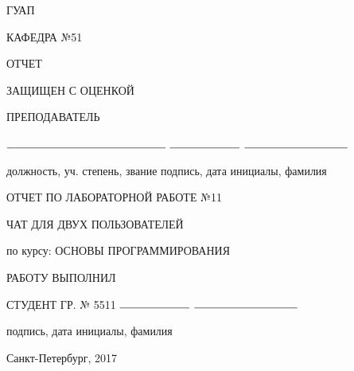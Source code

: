 \documentclass{article}
\begin{document}
\begin{titlepage}
	\begin{center}
    	ГУАП
    	\vspace{0.25cm}

    	КАФЕДРА №51
	\end{center}

    \begin{flushleft}

    	ОТЧЕТ

    	ЗАЩИЩЕН С ОЦЕНКОЙ

		ПРЕПОДАВАТЕЛЬ


    	\vspace{0.5cm}

		$\rule{5cm}{0.15mm}$ \hfill $\rule{2.2cm}{0.15mm}$  \hfill $\rule{3.25cm}{0.15mm}$

		должность, уч. степень, звание \hfill подпись, дата \hfill инициалы, фамилия
    \end{flushleft}

 	
    \hspace{2cm}

	\begin{center}
    	ОТЧЕТ ПО ЛАБОРАТОРНОЙ РАБОТЕ №11


    	\vspace{1cm}

    	ЧАТ ДЛЯ ДВУХ ПОЛЬЗОВАТЕЛЕЙ


    	\vspace{1cm}

    	по курсу: ОСНОВЫ ПРОГРАММИРОВАНИЯ {\MakeUppercase{}}
    \end{center}

    \vspace{3cm}

    \begin{flushleft}
    	РАБОТУ ВЫПОЛНИЛ

    	СТУДЕНТ ГР. № 5511 \hfill $\rule{2.2cm}{0.15mm}$  \hfill $\rule{3.25cm}{0.15mm}$

    	\hspace{7.8cm} подпись, дата \hfill инициалы, фамилия
    \end{flushleft}

	\vspace{5cm}
	\begin{center}
 		Санкт-Петербург, 2017
	\end{center}
\end{titlepage}
\end{document}

